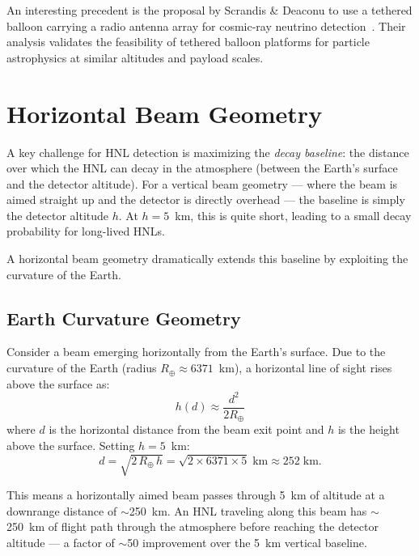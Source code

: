 \documentclass[11pt]{article}
\begin{document}
An interesting precedent is the proposal by Scrandis \& Deaconu to use
a tethered balloon carrying a radio antenna array for cosmic-ray neutrino
detection~\cite{ScrandisDeaconu}.  Their analysis validates the feasibility
of tethered balloon platforms for particle astrophysics at similar altitudes
and payload scales.


\section{Horizontal Beam Geometry}
\label{sec:geometry}

A key challenge for HNL detection is maximizing the \emph{decay baseline}:
the distance over which the HNL can decay in the atmosphere (between the
Earth's surface and the detector altitude).  For a vertical beam geometry
--- where the beam is aimed straight up and the detector is directly
overhead --- the baseline is simply the detector altitude $h$.  At
$h = 5$~km, this is quite short, leading to a small decay probability
for long-lived HNLs.

A horizontal beam geometry dramatically extends this baseline by
exploiting the curvature of the Earth.

\subsection{Earth Curvature Geometry}

Consider a beam emerging horizontally from the Earth's surface.
Due to the curvature of the Earth (radius $R_\oplus \approx 6371$~km),
a horizontal line of sight rises above the surface as:
\begin{equation}
  h(d) \approx \frac{d^2}{2 R_\oplus}
  \label{eq:curvature}
\end{equation}
where $d$ is the horizontal distance from the beam exit point and
$h$ is the height above the surface.  Setting $h = 5$~km:
\begin{equation}
  d = \sqrt{2\, R_\oplus\, h}
    = \sqrt{2 \times 6371 \times 5}\;\text{km}
    \approx 252\;\text{km}.
\end{equation}

This means a horizontally aimed beam passes through 5~km of altitude
at a downrange distance of $\sim$250~km.  An HNL traveling along this
beam has $\sim$250~km of flight path through the atmosphere before
reaching the detector altitude --- a factor of $\sim$50 improvement
over the 5~km vertical baseline.
\end{document}
